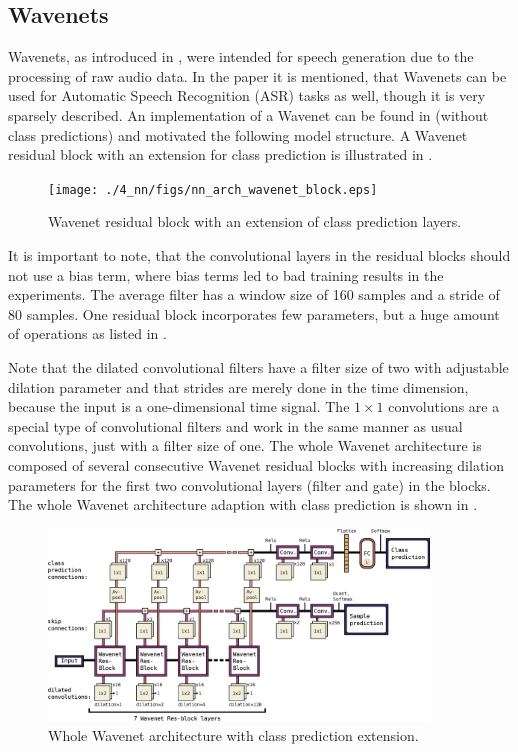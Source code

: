 \subsection{Wavenets}\label{sec:nn_arch_wavenet}
Wavenets, as introduced in \cite{Oord2016}, were intended for speech generation due to the processing of raw audio data.
In the paper it is mentioned, that Wavenets can be used for Automatic Speech Recognition (ASR) tasks as well, though it is very sparsely described.
An implementation of a Wavenet can be found in \cite{Herrmann2018} (without class predictions) and motivated the following model structure.
A Wavenet residual block with an extension for class prediction is illustrated in .
\begin{figure}[!ht]
  \centering
    \texttt{[image: ./4\_nn/figs/nn\_arch\_wavenet\_block.eps]}
  \caption{Wavenet residual block \cite{Oord2016} with an extension of class prediction layers.}
  \label{fig:nn_arch_wavenet_block}
\end{figure}
\FloatBarrier
\noindent
It is important to note, that the convolutional layers in the residual blocks should not use a bias term, where bias terms led to bad training results in the experiments.
The average filter has a window size of 160 samples and a stride of 80 samples.
One residual block incorporates few parameters, but a huge amount of operations as listed in .

Note that the dilated convolutional filters have a filter size of two with adjustable dilation parameter and that strides are merely done in the time dimension, because the input is a one-dimensional time signal.
The $1 \times 1$ convolutions are a special type of convolutional filters and work in the same manner as usual convolutions, just with a filter size of one. 
The whole Wavenet architecture is composed of several consecutive Wavenet residual blocks with increasing dilation parameters for the first two convolutional layers (filter and gate) in the blocks.
The whole Wavenet architecture adaption with class prediction is shown in .
\begin{figure}[!ht]
  \centering
    \includegraphics[width=0.9\textwidth]{./4_nn/figs/nn_arch_wavenet_all.eps}
  \caption{Whole Wavenet architecture with class prediction extension.}
  \label{fig:nn_arch_wavenet_all}
\end{figure}
